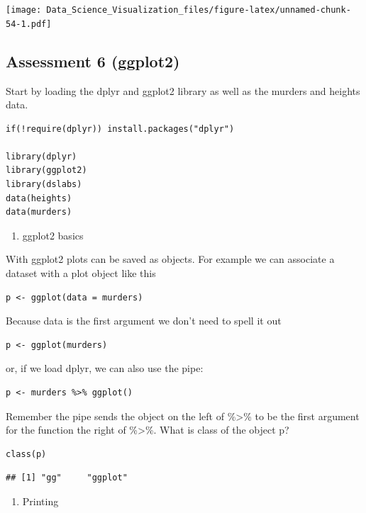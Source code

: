 \documentclass[
]{article}
\providecommand{\tightlist}{%
  \setlength{\itemsep}{0pt}\setlength{\parskip}{0pt}}
\begin{document}
\texttt{[image: Data\_Science\_Visualization\_files/figure-latex/unnamed-chunk-54-1.pdf]}

\hypertarget{assessment-6-ggplot2}{%
\subsection{Assessment 6 (ggplot2)}\label{assessment-6-ggplot2}}

Start by loading the dplyr and ggplot2 library as well as the murders
and heights data.

\begin{verbatim}
if(!require(dplyr)) install.packages("dplyr")

library(dplyr)
library(ggplot2)
library(dslabs)
data(heights)
data(murders)
\end{verbatim}

\begin{enumerate}
\def\labelenumi{\arabic{enumi}.}
\tightlist
\item
  ggplot2 basics
\end{enumerate}

With ggplot2 plots can be saved as objects. For example we can associate
a dataset with a plot object like this

\begin{verbatim}
p <- ggplot(data = murders)
\end{verbatim}

Because data is the first argument we don't need to spell it out

\begin{verbatim}
p <- ggplot(murders)
\end{verbatim}

or, if we load dplyr, we can also use the pipe:

\begin{verbatim}
p <- murders %>% ggplot()
\end{verbatim}

Remember the pipe sends the object on the left of \%\textgreater\% to be
the first argument for the function the right of \%\textgreater\%. What
is class of the object p?

\begin{verbatim}
class(p)
\end{verbatim}

\begin{verbatim}
## [1] "gg"     "ggplot"
\end{verbatim}

\begin{enumerate}
\def\labelenumi{\arabic{enumi}.}
\setcounter{enumi}{1}
\tightlist
\item
  Printing
\end{enumerate}
\end{document}
